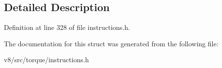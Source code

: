 \subsection{Detailed Description}


Definition at line 328 of file instructions.\+h.



The documentation for this struct was generated from the following file\+:\begin{DoxyCompactItemize}
\item 
v8/src/torque/instructions.\+h\end{DoxyCompactItemize}
